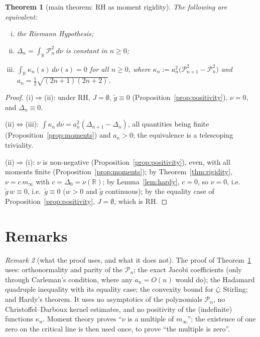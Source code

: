 \documentclass[11pt]{amsart}
\newtheorem{theorem}{Theorem}[section]
\theoremstyle{definition}
\theoremstyle{remark}
\newtheorem{remark}[theorem]{Remark}
\newcommand{\bbR}{\mathbb{R}}
\newcommand{\minf}{m_\infty}
\begin{document}
\begin{theorem}[main theorem: RH as moment rigidity]\label{thm:main}
The following are equivalent:
\begin{enumerate}[(i)]
\item the Riemann Hypothesis;
\item $\Delta_n=\int_\bbR\mathcal P_n^{2}\,d\nu$ is constant in $n\ge0$;
\item $\displaystyle\int_\bbR\kappa_n(s)\,d\nu(s)=0$ for all $n\ge0$, where
$\kappa_n:=a_n^{2}\bigl(\mathcal P_{n+1}^{2}-\mathcal P_n^{2}\bigr)$ and
$a_n=\tfrac12\sqrt{(2n+1)(2n+2)}$.
\end{enumerate}
\end{theorem}

\begin{proof}
(i)$\Rightarrow$(ii): under RH, $J=\emptyset$, $\tilde g\equiv0$
(Proposition~\ref{prop:positivity}), $\nu=0$, and $\Delta_n\equiv0$.

(ii)$\Leftrightarrow$(iii): $\int\kappa_n\,d\nu
=a_n^{2}(\Delta_{n+1}-\Delta_n)$, all quantities being finite
(Proposition~\ref{prop:moments}) and $a_n>0$; the equivalence is a
telescoping triviality.

(ii)$\Rightarrow$(i): $\nu$ is non-negative
(Proposition~\ref{prop:positivity}), even, with all moments finite
(Proposition~\ref{prop:moments}); by Theorem~\ref{thm:rigidity},
$\nu=c\,\minf$ with $c=\Delta_0=\nu(\bbR)$; by Lemma~\ref{lem:hardy},
$c=0$, so $\nu=0$, i.e.\ $\tilde g\,w\equiv0$, i.e.\ $\tilde g\equiv0$
($w>0$ and $\tilde g$ continuous); by the equality case of
Proposition~\ref{prop:positivity}, $J=\emptyset$, which is RH.
\end{proof}

\section{Remarks}\label{sec:remarks}

\begin{remark}[what the proof uses, and what it does not]
The proof of Theorem~\ref{thm:main} uses: orthonormality and parity of the
$\mathcal P_n$; the exact Jacobi coefficients (only through Carleman's
condition, where any $a_n=O(n)$ would do); the Hadamard quadruple inequality
with its equality case; the convexity bound for $\zeta$; Stirling; and
Hardy's theorem. It uses no asymptotics of the polynomials
$\mathcal P_n$, no Christoffel--Darboux kernel estimates, and no positivity
of the (indefinite) functions $\kappa_n$. Moment theory proves ``$\nu$ is a
multiple of $\minf$''; the existence of one zero on the critical line is
then used once, to prove ``the multiple is zero''.
\end{remark}
\end{document}
